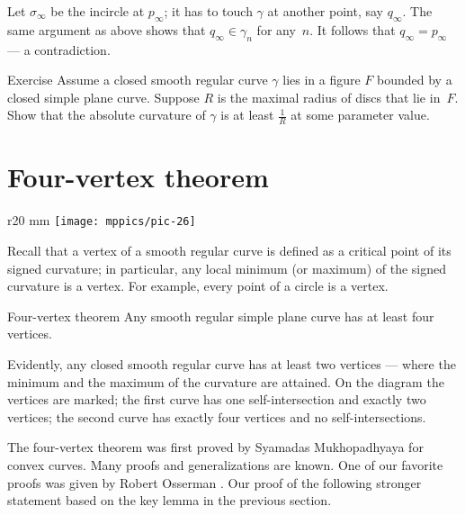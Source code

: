 Let $\sigma_\infty$ be the incircle at $p_\infty$; it has to touch $\gamma$ at another point, say $q_\infty$.
The same argument as above shows that $q_\infty\in\gamma_n$ for any~$n$.
It follows that $q_\infty =p_\infty$ --- a contradiction.
\qeds

\begin{thm}{Exercise}\label{ex:moon-rad}
Assume a closed smooth regular curve $\gamma$ lies in a figure $F$ bounded by a closed simple plane curve.
Suppose $R$ is the maximal radius of discs that lie in~$F$.
Show that the absolute curvature of $\gamma$ is at least $\tfrac1R$ at some parameter value.
\end{thm}


\section{Four-vertex theorem}
{

\begin{wrapfigure}{r}{20 mm}
\vskip-8mm
\centering
\texttt{[image: mppics/pic-26]}
\vskip0mm
\end{wrapfigure}

Recall that a vertex of a smooth regular curve is defined as a critical point of its signed curvature;
in particular, any local minimum (or maximum) of the signed curvature is a vertex.
For example, every point of a circle is a vertex.

\begin{thm}{Four-vertex theorem}\label{thm:4-vert}
Any smooth regular simple plane curve has at least four
vertices.
\end{thm}

}

Evidently, any closed smooth regular curve has at least two vertices --- where the minimum and the maximum of the curvature are attained.
On the diagram the vertices are marked;
the first curve has one self-intersection and exactly two vertices;
the second curve has exactly four vertices and no self-intersections.

The four-vertex theorem was first proved by Syamadas Mukhopadhyaya \cite{mukhopadhyaya} for convex curves.
Many proofs and generalizations are known.
One of our favorite proofs was given by Robert Osserman \cite{osserman}.
Our proof of the following stronger statement based on the key lemma in the previous section.

